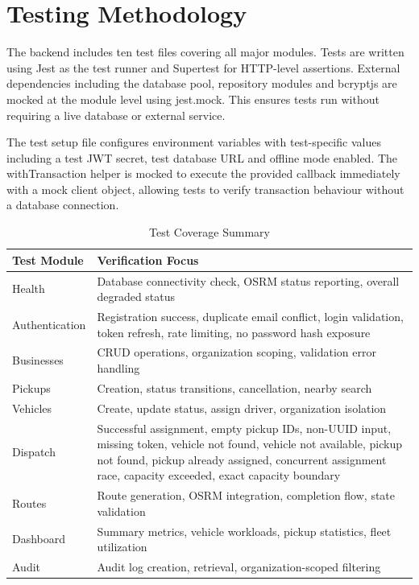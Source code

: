 \documentclass[12pt,a4paper]{report}
\begin{document}
\section{Testing Methodology}
The backend includes ten test files covering all major modules. Tests are written using Jest as the test runner and Supertest for HTTP-level assertions. External dependencies including the database pool, repository modules and bcryptjs are mocked at the module level using jest.mock. This ensures tests run without requiring a live database or external service.

The test setup file configures environment variables with test-specific values including a test JWT secret, test database URL and offline mode enabled. The withTransaction helper is mocked to execute the provided callback immediately with a mock client object, allowing tests to verify transaction behaviour without a database connection.

\begin{table}[h!]
\centering
\caption{Test Coverage Summary}
\begin{tabular}{|p{1.5in}|p{4.0in}|}
\hline
\textbf{Test Module} & \textbf{Verification Focus}\\\hline
Health & Database connectivity check, OSRM status reporting, overall degraded status\\\hline
Authentication & Registration success, duplicate email conflict, login validation, token refresh, rate limiting, no password hash exposure\\\hline
Businesses & CRUD operations, organization scoping, validation error handling\\\hline
Pickups & Creation, status transitions, cancellation, nearby search\\\hline
Vehicles & Create, update status, assign driver, organization isolation\\\hline
Dispatch & Successful assignment, empty pickup IDs, non-UUID input, missing token, vehicle not found, vehicle not available, pickup not found, pickup already assigned, concurrent assignment race, capacity exceeded, exact capacity boundary\\\hline
Routes & Route generation, OSRM integration, completion flow, state validation\\\hline
Dashboard & Summary metrics, vehicle workloads, pickup statistics, fleet utilization\\\hline
Audit & Audit log creation, retrieval, organization-scoped filtering\\\hline
\end{tabular}
\end{table}
\end{document}
